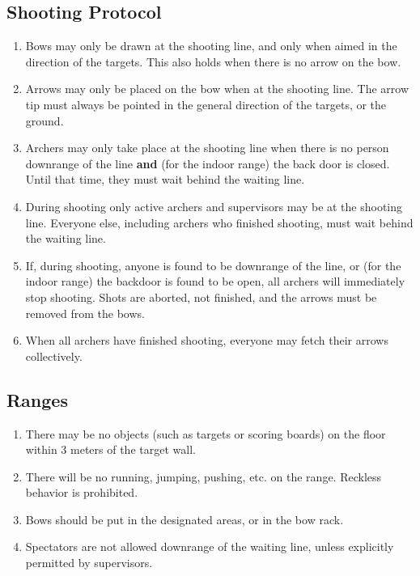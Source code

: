 \documentclass[a4paper]{article}
\begin{document}
\subsection{Shooting Protocol}

\begin{enumerate}
  \item Bows may only be drawn at the { shooting line}, and only when aimed in the direction of the targets. This also holds when there is no arrow on the bow.
  \item Arrows may only be placed on the bow when at the { shooting line}. The arrow tip must always be pointed in the general direction of the targets, or the ground.
  \item { Archers} may only take place at the { shooting line} when there is no person { downrange of the line} {\bf and} (for the indoor range) the back door is closed. Until that time, they must wait behind the { waiting line}.
  \item During shooting only active { archers} and { supervisors} may be at the { shooting line}. Everyone else, including { archers} who finished shooting, must wait behind the { waiting line}.
  \item If, during shooting, anyone is found to be { downrange of the line}, or (for the indoor range) the backdoor is found to be open, all { archers} will immediately stop shooting. Shots are aborted, not finished, and the arrows must be removed from the bows.
  \item When all { archers} have finished shooting, everyone may fetch their arrows collectively.
\end{enumerate}

\subsection{Ranges}

\begin{enumerate}
  \item There may be no objects (such as targets or scoring boards) on the floor within 3 meters of the target wall.
  \item There will be no running, jumping, pushing, etc. on the range. Reckless behavior is prohibited.
  \item Bows should be put in the designated areas, or in the bow rack.
  \item Spectators are not allowed downrange of the { waiting line}, unless explicitly permitted by supervisors.
\end{enumerate}
\end{document}
